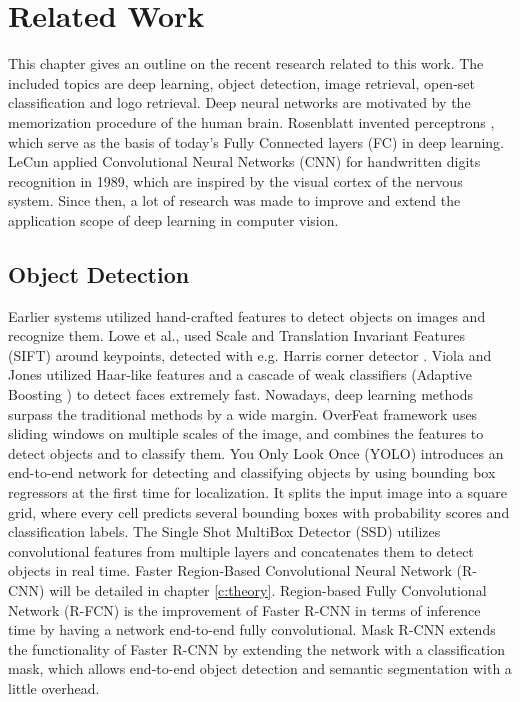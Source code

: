 \chapter{Related Work}\label{c:relatedwork}

This chapter gives an outline on the recent research related to this work. The included topics are deep learning, object detection, image retrieval, open-set classification and logo retrieval.
Deep neural networks are motivated by the memorization procedure of the human brain. Rosenblatt invented perceptrons \cite{Rosenblatt58theperceptron:}, which serve as the basis of today's Fully Connected layers (FC) in deep learning. LeCun applied \cite{LeCun:1989:BAH:1351079.1351090} Convolutional Neural Networks (CNN) for handwritten digits recognition in 1989, which are inspired by the visual cortex of the nervous system. Since then, a lot of research was made to improve and extend the application scope of deep learning in computer vision.
\section{Object Detection}
Earlier systems utilized hand-crafted features to detect objects on images and recognize them. Lowe et al., used Scale and Translation Invariant Features (SIFT) \cite{Lowe:2004:DIF:993451.996342} around keypoints, detected with e.g. Harris corner detector \cite{Harris}. Viola and Jones utilized \cite{Viola:2004:RRF:966432.966458} Haar-like features and a cascade of weak classifiers (Adaptive Boosting \cite{Schapire:1999:BIB:1624312.1624417}) to detect faces extremely fast. Nowadays, deep learning methods surpass the traditional methods by a wide margin. OverFeat framework \cite{journals/corr/SermanetEZMFL13} uses sliding windows on multiple scales of the image, and combines the features to detect objects and to classify them. You Only Look Once (YOLO) \cite{DBLP:journals/corr/RedmonDGF15} introduces an end-to-end network for detecting and classifying objects by using bounding box regressors at the first time for localization. It splits the input image into a square grid, where every cell predicts several bounding boxes with probability scores and classification labels. The Single Shot MultiBox Detector (SSD) \cite{journals/corr/LiuAESR15} utilizes convolutional features from multiple layers and concatenates them to detect objects in real time. Faster Region-Based Convolutional Neural Network (R-CNN) \cite{NIPS2015_5638} will be detailed in chapter \ref{c:theory}. Region-based Fully Convolutional Network (R-FCN) \cite{DBLP:journals/corr/DaiLHS16} is the improvement of Faster R-CNN in terms of inference time by having a network end-to-end fully convolutional. Mask R-CNN \cite{he2017maskrcnn} extends the functionality of Faster R-CNN by extending the network with a classification mask, which allows end-to-end object detection and semantic segmentation with a little overhead.
